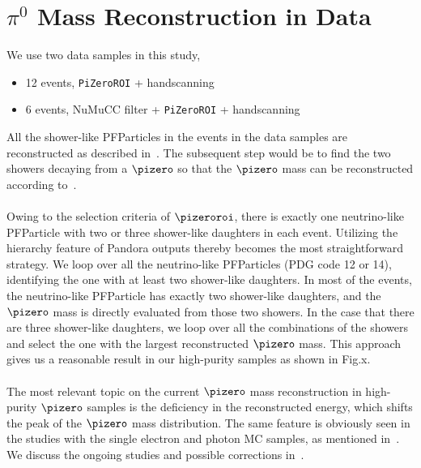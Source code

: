 \section{$\pi^{0}$ Mass Reconstruction in Data}
\label{sec:data_pi0}

We use two data samples in this study,
\begin{itemize}
\item 12 events, \texttt{PiZeroROI} + handscanning
\item 6 events, NuMuCC filter + \texttt{PiZeroROI} + handscanning
\end{itemize}

All the shower-like PFParticles in the events in the data samples 
are reconstructed as described in~.
The subsequent step would be to find the two showers decaying from a 
$\pizero$ so that the $\pizero$ mass can be reconstructed according
to~. \\
\\
Owing to the selection criteria of $\pizeroroi$, there is exactly one
neutrino-like PFParticle with two or three shower-like daughters in
each event.
Utilizing the hierarchy feature of Pandora outputs thereby becomes
the most straightforward strategy.
We loop over all the neutrino-like PFParticles (PDG code 12 or 14), 
identifying the one with at least two shower-like daughters.
In most of the events, the neutrino-like PFParticle has exactly two 
shower-like daughters, and the $\pizero$ mass is directly evaluated
from those two showers.
In the case that there are three shower-like daughters, we loop over
all the combinations of the showers and select the one with the largest
reconstructed $\pizero$ mass.
This approach gives us a reasonable result in our high-purity samples
as shown in Fig.x.\\
\\
The most relevant topic on the current $\pizero$ mass reconstruction
in high-purity $\pizero$ samples is the deficiency in the reconstructed
energy, which shifts the peak of the $\pizero$ mass distribution.
The same feature is obviously seen in the studies with the single electron
and photon MC samples, as mentioned in~.
We discuss the ongoing studies and possible corrections in~.


